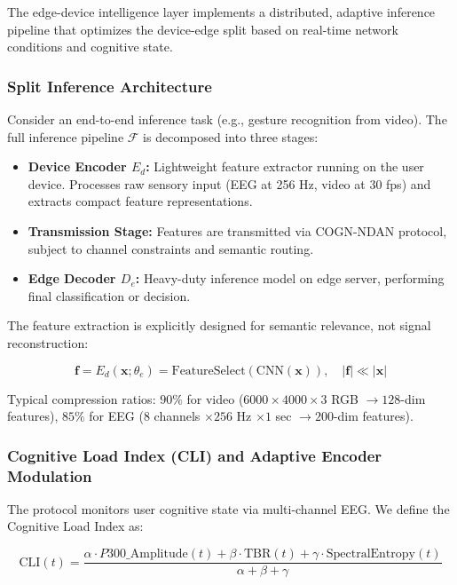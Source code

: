 \documentclass[journal]{IEEEtran}
\newcommand{\COGN}{COGN-NDAN}
\begin{document}
The edge-device intelligence layer implements a distributed, adaptive inference pipeline that optimizes the device-edge split based on real-time network conditions and cognitive state.

\subsubsection{Split Inference Architecture}
Consider an end-to-end inference task (e.g., gesture recognition from video). The full inference pipeline $\mathcal{F}$ is decomposed into three stages:
\begin{itemize}
    \item \textbf{Device Encoder $E_d$:} Lightweight feature extractor running on the user device. Processes raw sensory input (EEG at 256 Hz, video at 30 fps) and extracts compact feature representations.
    \item \textbf{Transmission Stage:} Features are transmitted via \COGN{} protocol, subject to channel constraints and semantic routing.
    \item \textbf{Edge Decoder $D_e$:} Heavy-duty inference model on edge server, performing final classification or decision.
\end{itemize}

The feature extraction is explicitly designed for semantic relevance, not signal reconstruction:

\begin{equation}
    \mathbf{f} = E_d(\mathbf{x}; \theta_e) = \text{FeatureSelect}(\text{CNN}(\mathbf{x})), \quad |\mathbf{f}| \ll |\mathbf{x}|
\end{equation}

Typical compression ratios: $90\%$ for video ($6000 \times 4000 \times 3$ RGB $\to 128$-dim features), $85\%$ for EEG ($8$ channels $\times 256$ Hz $\times 1$ sec $\to 200$-dim features).

\subsubsection{Cognitive Load Index (CLI) and Adaptive Encoder Modulation}
The protocol monitors user cognitive state via multi-channel EEG. We define the Cognitive Load Index as:

\begin{equation}
    \text{CLI}(t) = \frac{\alpha \cdot P300\_\text{Amplitude}(t) + \beta \cdot \text{TBR}(t) + \gamma \cdot \text{SpectralEntropy}(t)}{\alpha + \beta + \gamma}
\end{equation}
\end{document}
